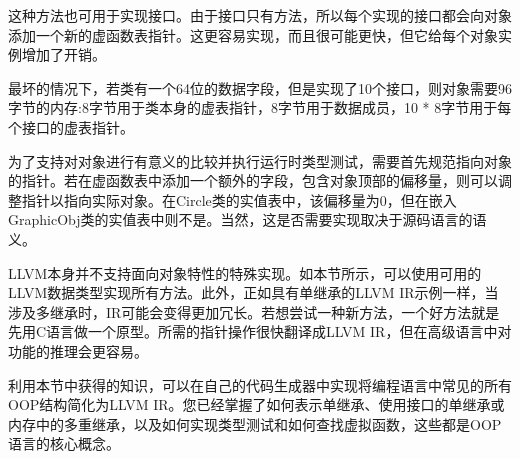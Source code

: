 这种方法也可用于实现接口。由于接口只有方法，所以每个实现的接口都会向对象添加一个新的虚函数表指针。这更容易实现，而且很可能更快，但它给每个对象实例增加了开销。

最坏的情况下，若类有一个64位的数据字段，但是实现了10个接口，则对象需要96字节的内存:8字节用于类本身的虚表指针，8字节用于数据成员，10 * 8字节用于每个接口的虚表指针。

为了支持对对象进行有意义的比较并执行运行时类型测试，需要首先规范指向对象的指针。若在虚函数表中添加一个额外的字段，包含对象顶部的偏移量，则可以调整指针以指向实际对象。在Circle类的实值表中，该偏移量为0，但在嵌入GraphicObj类的实值表中则不是。当然，这是否需要实现取决于源码语言的语义。

LLVM本身并不支持面向对象特性的特殊实现。如本节所示，可以使用可用的LLVM数据类型实现所有方法。此外，正如具有单继承的LLVM IR示例一样，当涉及多继承时，IR可能会变得更加冗长。若想尝试一种新方法，一个好方法就是先用C语言做一个原型。所需的指针操作很快翻译成LLVM IR，但在高级语言中对功能的推理会更容易。

利用本节中获得的知识，可以在自己的代码生成器中实现将编程语言中常见的所有OOP结构简化为LLVM IR。您已经掌握了如何表示单继承、使用接口的单继承或内存中的多重继承，以及如何实现类型测试和如何查找虚拟函数，这些都是OOP语言的核心概念。

















































